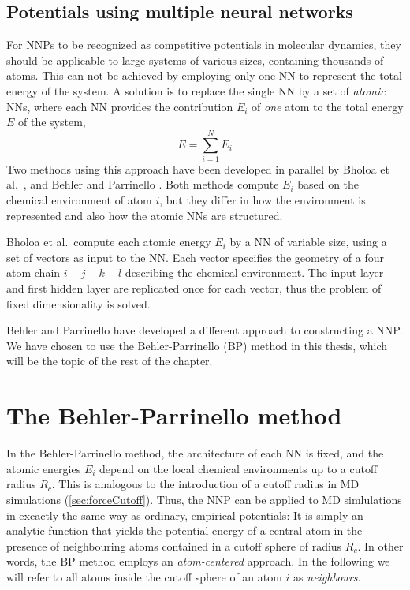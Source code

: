 \documentclass[twoside,english]{uiofysmaster}
\begin{document}
\subsection{Potentials using multiple neural networks}
For NNPs to be recognized as competitive potentials in molecular dynamics, they should be applicable to large systems
of various sizes, containing thousands of atoms. This can not be achieved by employing only one NN to 
represent the total energy of the system. A solution is to replace the single NN by a set of \textit{atomic} NNs, where 
each NN provides the contribution $E_i$ of \textit{one} atom to the total energy $E$ of the system, 
\begin{equation}
 E = \sum_{i=1}^N E_i
 \label{systemEnergy}
\end{equation}
Two methods using this approach have been developed in parallel by Bholoa et al.\ \cite{Bholoa07}, and Behler and Parrinello 
\cite{Behler07}.
Both methods compute $E_i$ based on the chemical environment of atom $i$, but they differ in how 
the environment is represented and also how the atomic NNs are structured. 

Bholoa et al.\ compute each atomic energy $E_i$ by a NN of variable size, using a set of 
vectors as input to the NN. Each vector specifies the geometry of a four atom chain $i-j-k-l$ describing the chemical 
environment. The input layer and first hidden layer are replicated once for each vector, thus the problem 
of fixed dimensionality is solved. 

Behler and Parrinello have developed a different approach to constructing a NNP. 
We have chosen to use the Behler-Parrinello (BP) method in this thesis, which will be the topic of the 
rest of the chapter. 

\section{The Behler-Parrinello method}
In the Behler-Parrinello method, the architecture of each NN is fixed, and
the atomic energies $E_i$ depend on the local chemical environments up to a cutoff radius $R_c$. 
This is analogous to the introduction of a cutoff radius in MD simulations
(\autoref{sec:forceCutoff}). Thus, the NNP can be applied to MD simlulations in excactly the same way 
as ordinary, empirical potentials: It is simply an analytic function that yields the potential energy of a central atom
in the presence of neighbouring atoms contained in a cutoff sphere of radius $R_c$. 
In other words, the BP method employs an \textit{atom-centered} approach. 
In the following we will refer to all atoms inside the cutoff sphere of an atom $i$ as \textit{neighbours}.
\end{document}
